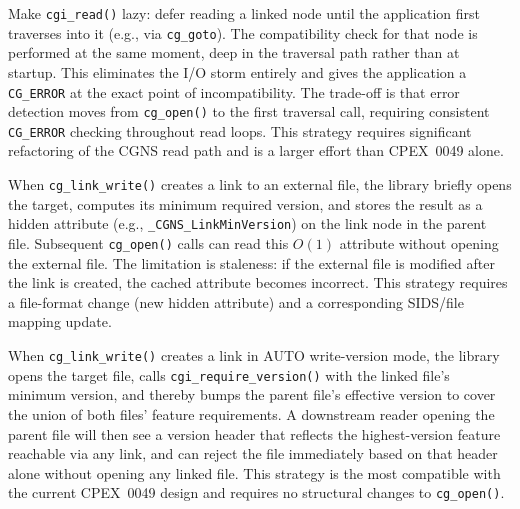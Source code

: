 \documentclass[11pt,letterpaper]{article}
\begin{document}
\begin{description}[leftmargin=2em]

\item[Strategy 1: Deferred just-in-time validation (recommended).]
  Make \texttt{cgi\_read()} lazy: defer reading a linked node until
  the application first traverses into it (e.g., via
  \texttt{cg\_goto}).  The compatibility check for that node is
  performed at the same moment, deep in the traversal path rather
  than at startup.  This eliminates the I/O storm entirely and gives
  the application a \texttt{CG\_ERROR} at the exact point of
  incompatibility.  The trade-off is that error detection moves from
  \texttt{cg\_open()} to the first traversal call, requiring
  consistent \texttt{CG\_ERROR} checking throughout read loops.
  This strategy requires significant refactoring of the CGNS read
  path and is a larger effort than CPEX~0049 alone.

\item[Strategy 2: Embedded link version metadata.]
  When \texttt{cg\_link\_write()} creates a link to an external file,
  the library briefly opens the target, computes its minimum required
  version, and stores the result as a hidden attribute
  (e.g., \texttt{\_CGNS\_LinkMinVersion}) on the link node in the
  parent file.  Subsequent \texttt{cg\_open()} calls can read this
  $O(1)$ attribute without opening the external file.  The limitation
  is staleness: if the external file is modified after the link is
  created, the cached attribute becomes incorrect.  This strategy
  requires a file-format change (new hidden attribute) and a
  corresponding SIDS/file mapping update.

\item[Strategy 3: Write-time cascading version inheritance.]
  When \texttt{cg\_link\_write()} creates a link in AUTO write-version
  mode, the library opens the target file, calls
  \texttt{cgi\_require\_version()} with the linked file's minimum
  version, and thereby bumps the parent file's effective version to
  cover the union of both files' feature requirements.  A downstream
  reader opening the parent file will then see a version header that
  reflects the highest-version feature reachable via any link, and
  can reject the file immediately based on that header alone without
  opening any linked file.  This strategy is the most compatible
  with the current CPEX~0049 design and requires no structural
  changes to \texttt{cg\_open()}.

\end{description}
\end{document}

